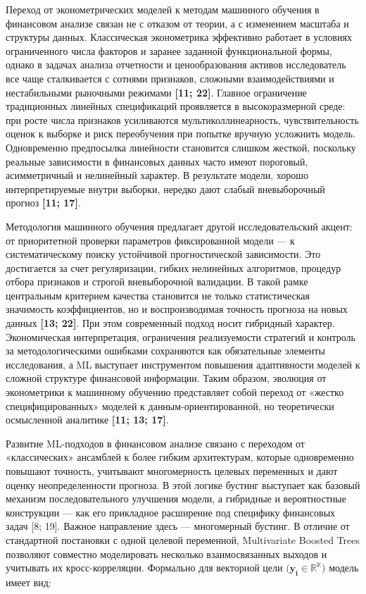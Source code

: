 \documentclass[
]{article}
\begin{document}
Переход от эконометрических моделей к методам машинного обучения в финансовом анализе связан не с отказом от теории, а с изменением масштаба и структуры данных. Классическая эконометрика эффективно работает в условиях ограниченного числа факторов и заранее заданной функциональной формы, однако в задачах анализа отчетности и ценообразования активов исследователь все чаще сталкивается с сотнями признаков, сложными взаимодействиями и нестабильными рыночными режимами \textbf{{[}11; 22{]}}. Главное ограничение традиционных линейных спецификаций проявляется в высокоразмерной среде: при росте числа признаков усиливаются мультиколлинеарность, чувствительность оценок к выборке и риск переобучения при попытке вручную усложнить модель. Одновременно предпосылка линейности становится слишком жесткой, поскольку реальные зависимости в финансовых данных часто имеют пороговый, асимметричный и нелинейный характер. В результате модели, хорошо интерпретируемые внутри выборки, нередко дают слабый вневыборочный прогноз \textbf{{[}11; 17{]}}.

Методология машинного обучения предлагает другой исследовательский акцент: от приоритетной проверки параметров фиксированной модели --- к систематическому поиску устойчивой прогностической зависимости. Это достигается за счет регуляризации, гибких нелинейных алгоритмов, процедур отбора признаков и строгой вневыборочной валидации. В такой рамке центральным критерием качества становится не только статистическая значимость коэффициентов, но и воспроизводимая точность прогноза на новых данных \textbf{{[}13; 22{]}}. При этом современный подход носит гибридный характер. Экономическая интерпретация, ограничения реализуемости стратегий и контроль за методологическими ошибками сохраняются как обязательные элементы исследования, а ML выступает инструментом повышения адаптивности моделей к сложной структуре финансовой информации. Таким образом, эволюция от эконометрики к машинному обучению представляет собой переход от «жестко специфицированных» моделей к данным-ориентированной, но теоретически осмысленной аналитике \textbf{{[}11; 13; 17{]}}.

Развитие ML-подходов в финансовом анализе связано с переходом от «классических» ансамблей к более гибким архитектурам, которые одновременно повышают точность, учитывают многомерность целевых переменных и дают оценку неопределенности прогноза. В этой логике бустинг выступает как базовый механизм последовательного улучшения модели, а гибридные и вероятностные конструкции --- как его прикладное расширение под специфику финансовых задач {[}8; 19{]}. Важное направление здесь --- многомерный бустинг. В отличие от стандартной постановки с одной целевой переменной, Multivariate Boosted Trees позволяют совместно моделировать несколько взаимосвязанных выходов и учитывать их кросс-корреляции. Формально для векторной цели \(\text{(}\mathbf{y}_{\mathbf{i}} \in \mathbb{R}^{\mathbb{K}}\text{)}\) модель имеет вид:
\end{document}
